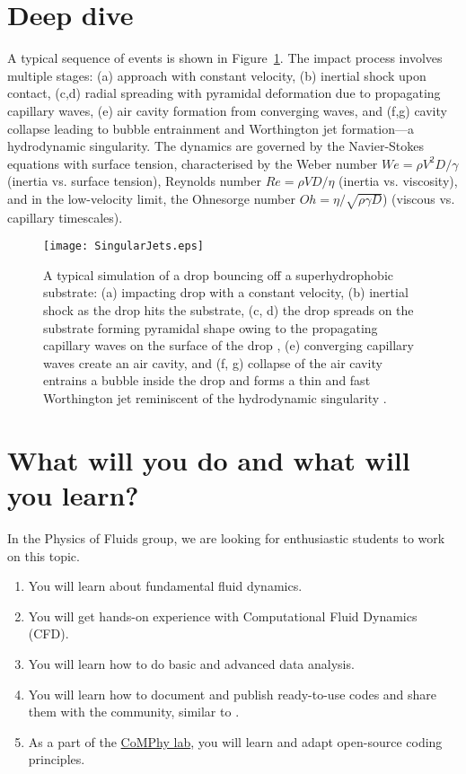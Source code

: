 \documentclass[a4paper,10pt]{article}
\begin{document}
\section*{Deep dive}

A typical sequence of events is shown in Figure~\ref{Figure::Typical}. The impact process involves multiple stages: (a) approach with constant velocity, (b) inertial shock upon contact, (c,d) radial spreading with pyramidal deformation due to propagating capillary waves, (e) air cavity formation from converging waves, and (f,g) cavity collapse leading to bubble entrainment and Worthington jet formation—a hydrodynamic singularity. The dynamics are governed by the Navier-Stokes equations with surface tension, characterised by the Weber number $We = \rho V^2D/\gamma$ (inertia vs. surface tension), Reynolds number $Re = \rho VD/\eta$ (inertia vs. viscosity), and in the low-velocity limit, the Ohnesorge number $Oh = \eta/\sqrt{\rho\gamma D}$) (viscous vs. capillary timescales).

\begin{figure}
\begin{center}
 \texttt{[image: SingularJets.eps]}
 \caption{A typical simulation of a drop bouncing off a superhydrophobic substrate: (a) impacting drop with a constant velocity, (b) inertial shock as the drop hits the substrate, (c, d) the drop spreads on the substrate forming pyramidal shape owing to the propagating capillary waves on the surface of the drop \citep{renardy2003pyramidal, zhang2022impact}, (e) converging capillary waves create an air cavity, and (f, g) collapse of the air cavity entrains a bubble inside the drop and forms a thin and fast Worthington jet reminiscent of the hydrodynamic singularity \citep{Bartolo2006Singular}.}
 \label{Figure::Typical}
\end{center}

\end{figure}
\section*{What will you do and what will you learn?}
In the Physics of Fluids group, we are looking for enthusiastic students to work on this topic.
\begin{enumerate}
\itemsep0em
\item You will learn about fundamental fluid dynamics.
\item You will get hands-on experience with Computational Fluid Dynamics (CFD).
\item You will learn how to do basic and advanced data analysis.
\item You will learn how to document and publish ready-to-use codes and share them with the community, similar to \citet{basiliskVatsal, basiliskVatsalDropFilm, basiliskVatsalViscousBouncing}. 
\item As a part of the \href{https://comphy-lab.org}{CoMPhy lab}, you will learn and adapt open-source coding principles. 
\end{enumerate}
\end{document}
